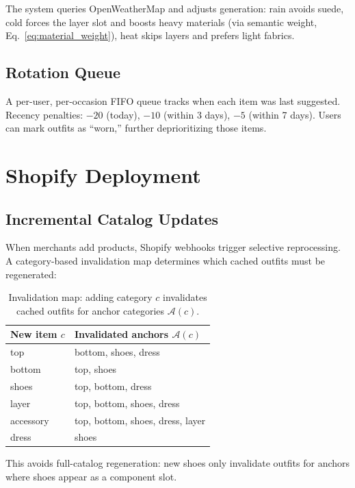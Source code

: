 \documentclass[10pt,twocolumn]{article}
\begin{document}
The system queries OpenWeatherMap and adjusts generation: rain avoids suede,
cold forces the layer slot and boosts heavy materials (via semantic weight,
Eq.~\ref{eq:material_weight}), heat skips layers and prefers light fabrics.

\subsection{Rotation Queue}

A per-user, per-occasion FIFO queue tracks when each item was last
suggested.  Recency penalties: $-20$ (today), $-10$ (within 3 days), $-5$
(within 7 days).  Users can mark outfits as ``worn,'' further deprioritizing
those items.

\section{Shopify Deployment}
\label{sec:shopify}

\subsection{Incremental Catalog Updates}

When merchants add products, Shopify webhooks trigger selective
reprocessing.  A category-based invalidation map determines which cached
outfits must be regenerated:

\begin{table}[h]
\centering
\small
\caption{Invalidation map: adding category $c$ invalidates cached outfits
for anchor categories $\mathcal{A}(c)$.}
\label{tab:invalidation}
\begin{tabular}{ll}
\toprule
New item $c$ & Invalidated anchors $\mathcal{A}(c)$ \\
\midrule
top       & bottom, shoes, dress \\
bottom    & top, shoes \\
shoes     & top, bottom, dress \\
layer     & top, bottom, shoes, dress \\
accessory & top, bottom, shoes, dress, layer \\
dress     & shoes \\
\bottomrule
\end{tabular}
\end{table}

This avoids full-catalog regeneration: new shoes only invalidate outfits
for anchors where shoes appear as a component slot.
\end{document}
